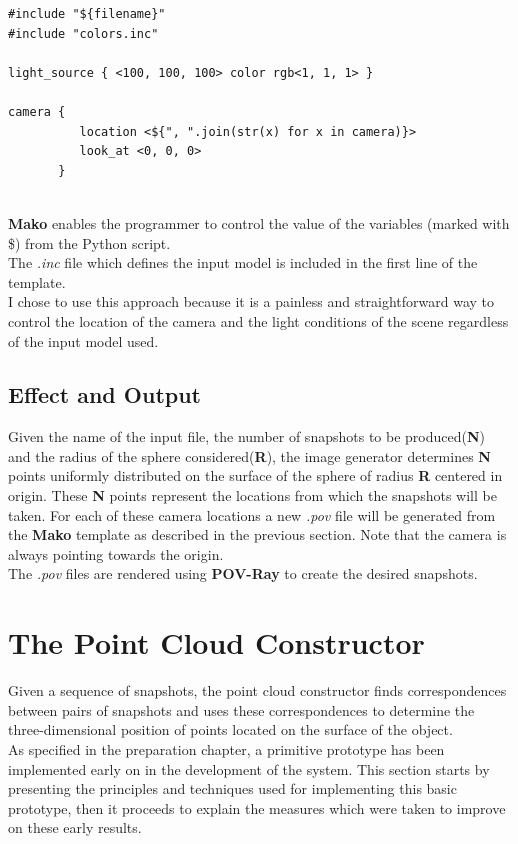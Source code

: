 \documentclass[12pt,a4paper,twoside,openright]{report}
\begin{document}
\begin{verbatim}
#include "${filename}"
#include "colors.inc"

light_source { <100, 100, 100> color rgb<1, 1, 1> }

camera {
          location <${", ".join(str(x) for x in camera)}>
          look_at <0, 0, 0>
       }
\end{verbatim} \\

\textbf{Mako} enables the programmer to control the value of the variables (marked with \$) from the Python script. \\
The \textit{.inc} file which defines the input model is included in the first line of the template. \\
I chose to use this approach because it is a painless and straightforward way to control the location of the camera and the light conditions of the scene regardless of the input model used. 

\subsection{Effect and Output}
Given the name of the input file, the number of snapshots to be produced(\textbf{N}) and the radius of the sphere considered(\textbf{R}), the image generator determines \textbf{N} points uniformly distributed on the surface of the sphere of radius \textbf{R} centered in origin. These \textbf{N} points represent the locations from which the snapshots will be taken. For each of these camera locations a new \textit{.pov} file will be generated from the \textbf{Mako} template as described in the previous section. Note that the camera is always pointing towards the origin. \\
The \textit{.pov} files are rendered using \textbf{POV-Ray} to create the desired snapshots.

\section{The Point Cloud Constructor}
Given a sequence of snapshots, the point cloud constructor finds correspondences between pairs of snapshots and uses these correspondences to determine the three-dimensional position of points located on the surface of the object. \\
\linebreak
As specified in the preparation chapter, a primitive prototype has been implemented early on in the development of the system. This section starts by presenting the principles and techniques used for implementing this basic prototype, then it proceeds to explain the measures which were taken to improve on these early results.
\end{document}

